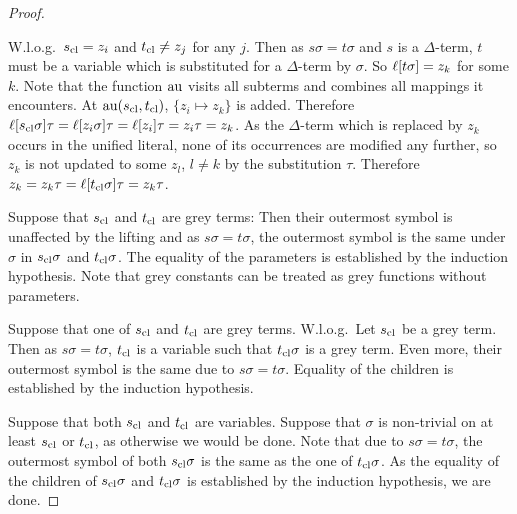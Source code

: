\documentclass[,%
	paper=a4,%
	DIV15, 
	liststotoc,
	bibtotoc,
	draft=false,%
	numbers=noendperiod
]{scrartcl}
\begin{document}
\begin{proof}
\begin{compactitem}
		\item W.l.o.g.~$s_\mathrm{cl} = z_i$ and $t_\mathrm{cl} \neq z_j$ for any $j$.
			Then as $s\sigma = t\sigma$ and $s$ is a $\Delta$-term, $t$ must be a variable which is substituted for a $\Delta$-term by $\sigma$.
			So $\ell[t\sigma] = z_k$ for some $k$.
			Note that the function $\operatorname{au}$ visits all subterms and combines all mappings it encounters.
			At $\operatorname{au}(s_\mathrm{cl}, t_\mathrm{cl})$, $\{ z_i \mapsto z_k \}$ is added.
			Therefore $\ell[s_\mathrm{cl}\sigma]\tau = \ell[z_i\sigma]\tau = \ell[z_i]\tau = z_i\tau = z_k$.
			As the $\Delta$-term which is replaced by $z_k$ occurs in the unified literal, none of its occurrences are modified any further, so $z_k$ is not updated to some $z_l$, $l\neq k$ by the substitution $\tau$.
			Therefore $z_k = z_k \tau = \ell[t_\mathrm{cl}\sigma]\tau = z_k \tau$. 
	\end{compactitem}

	Suppose that $s_\mathrm{cl}$ and $t_\mathrm{cl}$ are grey terms:
	Then their outermost symbol is unaffected by the lifting and as $s\sigma = t\sigma$, the outermost symbol is the same under $\sigma$ in $s_\mathrm{cl} \sigma$ and $t_\mathrm{cl}\sigma$.
	The equality of the parameters is established by the induction hypothesis.
	Note that grey constants can be treated as grey functions without parameters.

	Suppose that one of $s_\mathrm{cl}$ and $t_\mathrm{cl}$ are grey terms. W.l.o.g.~Let $s_\mathrm{cl}$ be a grey term. Then as $s\sigma=t\sigma$, $t_\mathrm{cl}$ is a variable such that $t_\mathrm{cl}\sigma$ is a grey term. 
	Even more, their outermost symbol is the same due to $s\sigma = t\sigma$.
	Equality of the children is established by the induction hypothesis.


	Suppose that both $s_\mathrm{cl}$ and $t_\mathrm{cl}$ are variables. 
	Suppose that $\sigma$ is non-trivial on at least $s_\mathrm{cl}$ or $t_\mathrm{cl}$, as otherwise we would be done.
	Note that due to $s\sigma = t\sigma$, the outermost symbol of both $s_\mathrm{cl}\sigma$ is the same as the one of $t_\mathrm{cl}\sigma$. As the equality of the children of $s_\mathrm{cl}\sigma$ and $t_\mathrm{cl}\sigma$ is established by the induction hypothesis, we are done.
\end{proof}
\end{document}

